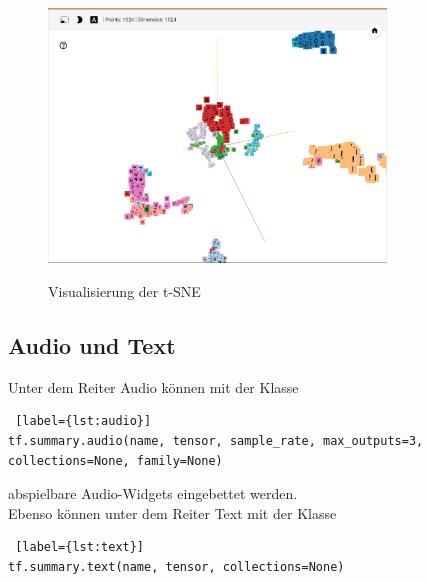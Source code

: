 \begin{itemize}
\begin{figure}[h!]
	\centering
	 \includegraphics[width=0.8\textwidth]{images/Kapitel_3/projektor_t-sne.png}\\
	\vspace{15pt} 
	\caption[Visualisierung der t-SNE]{Visualisierung der t-SNE}
	\label{fig:t-sne}
\end{figure}

\end{itemize}


\subsection{Audio und Text}

Unter dem Reiter Audio können mit der Klasse
\\

\begin{minipage}{\linewidth}
\begin{lstlisting} [label={lst:audio}]
tf.summary.audio(name, tensor, sample_rate, max_outputs=3, collections=None, family=None)
\end{lstlisting}
\end{minipage}
\vspace{0.2cm}

abspielbare Audio-Widgets eingebettet werden.\\

Ebenso können unter dem Reiter Text mit der Klasse
\\

\begin{minipage}{\linewidth}
\begin{lstlisting} [label={lst:text}]
tf.summary.text(name, tensor, collections=None)
\end{lstlisting}
\end{minipage}
\vspace{0.2cm}


